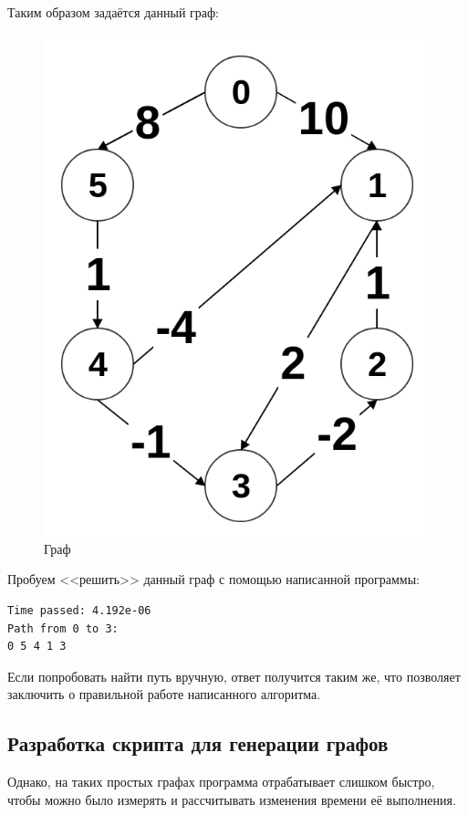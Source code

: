 \documentclass[utf8x, 14pt]{article}
\begin{document}
\newpage
Таким образом задаётся данный граф:

\begin{figure}[h!]
	\centering
	\includegraphics[scale=0.5]{graph.png}
	\caption{Граф}
\end{figure}

Пробуем <<решить>> данный граф с помощью написанной программы:

\begin{lstlisting}[frame=single]
Time passed: 4.192e-06
Path from 0 to 3: 
0 5 4 1 3 
\end{lstlisting}

Если попробовать найти путь вручную, ответ получится таким же, что позволяет заключить о правильной работе написанного алгоритма.

\subsection{Разработка скрипта для генерации графов}
Однако, на таких простых графах программа отрабатывает слишком быстро, чтобы можно было измерять и рассчитывать изменения времени её выполнения.
\end{document}
